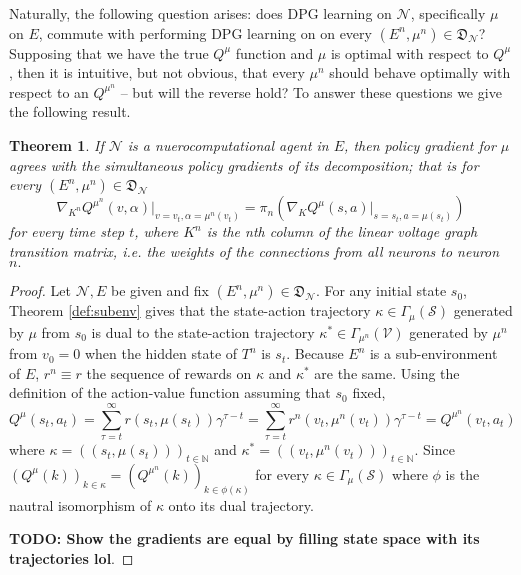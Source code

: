 \documentclass{article} %
\newtheorem{theorem}{Theorem}
\numberwithin{equation}{subsection}
\numberwithin{theorem}{subsection}
\theoremstyle{named}
\def\scriptv{{\mathcal V}}
\def\scriptn{{\mathcal N}}
\def\scripts{{\mathcal S}}
\begin{document}
Naturally, the following question arises: does DPG learning on $\scriptn$, specifically $\mu$ on $E$, commute with performing DPG learning on on every $(E^n, \mu^n) \in \mathfrak{D}_\scriptn$? Supposing that we have the true $Q^\mu$ function and $\mu$ is optimal with respect to $Q^\mu$, then it is intuitive, but not obvious, that every $\mu^n$ should behave optimally with respect to an $Q^{\mu^n}$ -- but will the reverse hold? To answer these questions we give the following result.
\begin{theorem}
    If $\scriptn$ is a nuerocomputational agent in $E$, then policy gradient for $\mu$ agrees with the simultaneous policy gradients of its decomposition; that is for every $(E^n, \mu^n) \in \mathfrak{D}_\scriptn$
    \begin{equation}
        \nabla_{K^n} Q^{\mu^n}(v,\alpha)\Big|_{v=v_t,\alpha=\mu^n(v_t)} =\pi_n \left(\nabla_{K} Q^{\mu}(s,a)\Big|_{s=s_t,a=\mu(s_t)}\right)
    \end{equation}
    for every time step $t$, where $K^n$ is the nth column of the linear voltage graph transition matrix, i.e. the weights of the connections from all neurons to neuron $n.$
\end{theorem}
\begin{proof}
  Let $\scriptn, E$ be given and fix $(E^n, \mu^n) \in \mathfrak{D}_\scriptn$.
  For any initial state $s_0$, Theorem  \ref{def:subenv} gives that the state-action trajectory $\kappa \in \Gamma_\mu(\scripts)$ generated by $\mu$ from $s_0$ is dual to the state-action trajectory $\kappa^* \in \Gamma_{\mu^n}(\scriptv)$ generated by $\mu^n$ from $v_0 = 0$ when the hidden state of $T^n$ is $s_t$. Because $E^n$ is a sub-environment of $E$, $r^n \equiv r$ the sequence of rewards on $\kappa$ and $\kappa^*$ are the same. Using the definition of the action-value function assuming that $s_0$ fixed, \begin{equation*}
      Q^{\mu}(s_t, a_t) = \sum_{\tau =t}^\infty r(s_t, \mu(s_t)) \gamma^{\tau - t} = \sum_{\tau =t}^\infty r^n(v_t, \mu^n(v_t)) \gamma^{\tau - t} = Q^{\mu^n}(v_t, a_t)
  \end{equation*}
  where $\kappa = ((s_t, \mu(s_t)))_{t\in\mathbb{N}}$ and $\kappa^* = ((v_t,\mu^n(v_t)))_{t\in\mathbb{N}}.$ Since $\left(Q^\mu(k)\right)_{k \in \kappa} = \left(Q^{\mu^n}(k)\right)_{k \in \phi(\kappa)}$ for every $\kappa \in \Gamma_{\mu}(\scripts)$ where $\phi$ is the nautral isomorphism of $\kappa$ onto its dual trajectory.

  \textbf{TODO: Show the gradients are equal by filling state space with its trajectories lol}.
\end{proof}
\end{document}
